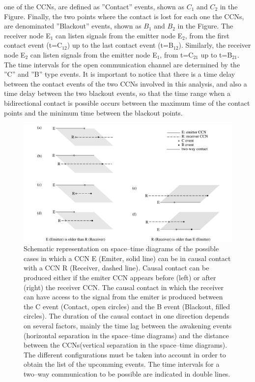 \documentclass[crop]{CSLB}
\newcommand{\ceti}{CCN}
\newcommand{\cetis}{CCNs}
\begin{document}
one of the \cetis{}, are defined as ''Contact'' events, shown as $C_1$
and $C_2$ in the Figure.
%
Finally, the two points where the contact is lost for each one the
\cetis{}, are denominated ''Blackout'' events, shown as $B_1$ and
$B_2$ in the Figure.
%
The receiver node E$_1$ can listen signals from the emitter node
E$_2$, from the first contact event (t=C$_{12}$) up to the last
contact event (t=B$_{12}$).
%
Similarly, the receiver node E$_2$ can listen signals from the emitter
node E$_1$, from t=C$_{21}$ up to t=B$_{21}$.
%
The time intervals for the open communication channel are determined
by the ''C'' and ''B'' type events.
%
It is important to notice that there is a time delay between the
contact events of the two \cetis{} involved in this analysis, and also
a time delay between the two blackout events, so that the time range
when a bidirectional contact is possible occurs between the maximum
time of the contact points and the minimum time between the blackout
points.

      
  
\begin{figure}
   \centering
   \includegraphics[width=\textwidth]{F_messages.pdf}
   \caption{
Schematic representation on space--time diagrams of the possible cases in which a
\ceti{} E (Emiter, solid line) can be in causal contact with a \ceti{} R
(Receiver, dashed line).
%
Causal contact can be produced either if the emiter \ceti{} appears before
(left) or after (right) the receiver \ceti{}.
%
The causal contact in which the receiver can have access to the signal 
from the emiter is produced between the C event (Contact, open circles) and the B
event (Blackout, filled circles).
%
The duration of the causal contact in one direction depends on
several factors, mainly the time lag between the awakening events
(horizontal separation in the space--time diagrams)
and the distance between the \cetis (vertical separation in the
space--time diagrams).
%   
The different configurations must be taken into account in order to 
obtain the list of the upcomming events.
%
The time intervals for a two--way communication to be possible are
indicated in double lines. 
%
   } \label{F_messages}
\end{figure}  
 
\end{document}
